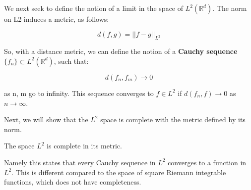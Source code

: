 \documentclass[class=article, crop=false]{standalone}
\begin{document}
		We next seek to define the notion of a limit in the space of $L^2(\mathbb{R}^d)$. The norm on L2 induces a metric, as follows:

			$$d(f,g) = ||f - g||_{L^2}$$

		So, with a distance metric, we can define the notion of a \textbf{Cauchy sequence} $\{f_n\} \subset L^2(\mathbb{R}^d)$, such that:

			$$d(f_n, f_m) \rightarrow 0$$

		as n, m go to infinity. This sequence converges to $f \in L^2$ if $d(f_n, f) \rightarrow 0$ as $n \rightarrow \infty$.

		Next, we will show that the $L^2$ space is complete with the metric defined by its norm.

		\begin{theorem} 
			The space $L^2$ is complete in its metric.

			Namely this states that every Cauchy sequence in $L^2$ converges to a function in $L^2$. This is different compared to the space of square Riemann integrable functions, which does not have completeness.
		\end{theorem}
\end{document}
